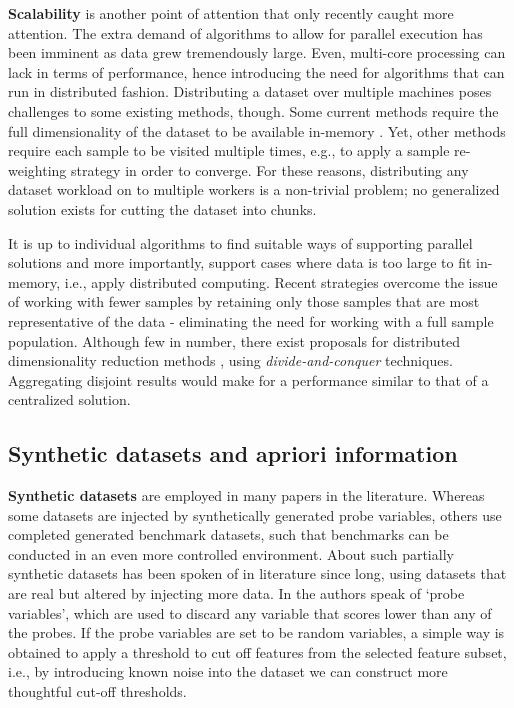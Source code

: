 \documentclass[../main.tex]{subfiles}
\begin{document}
\textbf{Scalability} is another point of attention that only recently caught more attention. The extra demand of algorithms to allow for parallel execution has been imminent as data grew tremendously large. Even, multi-core processing can lack in terms of performance, hence introducing the need for algorithms that can run in distributed fashion. Distributing a dataset over multiple machines poses challenges to some existing methods, though. Some current methods require the full dimensionality of the dataset to be available in-memory \citep{tang_feature_2014}. Yet, other methods require each sample to be visited multiple times, e.g., to apply a sample re-weighting strategy in order to converge. For these reasons, distributing any dataset workload on to multiple workers is a non-trivial problem; no generalized solution exists for cutting the dataset into chunks.

It is up to individual algorithms to find suitable ways of supporting parallel solutions and more importantly, support cases where data is too large to fit in-memory, i.e., apply distributed computing. Recent strategies overcome the issue of working with fewer samples by retaining only those samples that are most representative of the data - eliminating the need for working with a full sample population. Although few in number, there exist proposals for distributed dimensionality reduction methods \citep{li_distributed_2020}, using \textit{divide-and-conquer} techniques. Aggregating disjoint results would make for a performance similar to that of a centralized solution.




\subsection{Synthetic datasets and apriori information}
\textbf{Synthetic datasets} are employed in many papers in the literature. Whereas some datasets are injected by synthetically generated probe variables, others use completed generated benchmark datasets, such that benchmarks can be conducted in an even more controlled environment.
About such partially synthetic datasets has been spoken of in literature since long, using datasets that are real but altered by injecting more data. In \citep{guyon_introduction_2003} the authors speak of \lq probe variables', which are used to discard any variable that scores lower than any of the probes. If the probe variables are set to be random variables, a simple way is obtained to apply a threshold to cut off features from the selected feature subset, i.e., by introducing known noise into the dataset we can construct more thoughtful cut-off thresholds.
\end{document}
